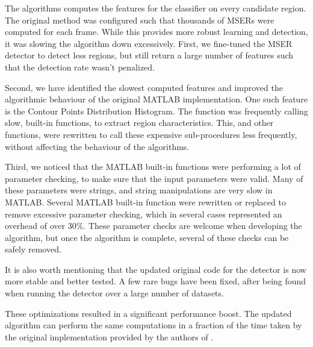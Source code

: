 		The algorithms computes the features for the classifier on every candidate region. The original method was configured such that thousands of MSERs were computed for each frame. While this provides more robust learning and detection, it was slowing the algorithm down excessively. First, we fine-tuned the MSER detector to detect less regions, but still return a large number of features such that the detection rate wasn't penalized.
		
		Second, we have identified the slowest computed features and improved the algorithmic behaviour of the original MATLAB implementation. One such feature is the Contour Points Distribution Histogram. The function was frequently calling slow, built-in functions, to extract region characteristics. This, and other functions, were rewritten to call these expensive sub-procedures less frequently, without affecting the behaviour of the algorithms.
		
		Third, we noticed that the MATLAB built-in functions were performing a lot of parameter checking, to make sure that the input parameters were valid. Many of these parameters were strings, and string manipulations are very slow in MATLAB. Several MATLAB built-in function were rewritten or replaced to remove excessive parameter checking, which in several cases represented an overhead of over $30\%$. These parameter checks are welcome when developing the algorithm, but once the algorithm is complete, several of these checks can be safely removed.
		
		It is also worth mentioning that the updated original code for the detector is now more stable and better tested. A few rare bugs have been fixed, after being found when running the detector over a large number of datasets.
		
		These optimizations resulted in a significant performance boost. The updated algorithm can perform the same computations in a fraction of the time taken by the original implementation provided by the authors of \cite{arteta12}.
	